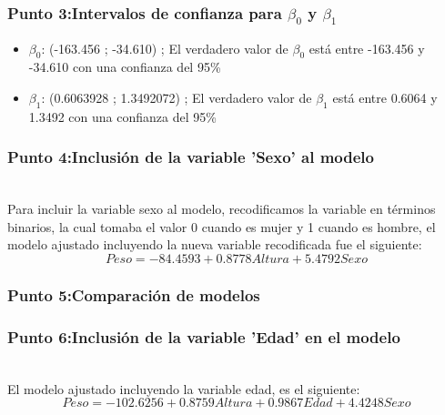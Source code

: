 \documentclass[12pt]{beamer}
\begin{document}
\begin{frame}
\frametitle{Punto 3:Intervalos de confianza para $\beta_{0}$ y $\beta_{1}$}
\begin{itemize}
\item $\beta_{0}$: (-163.456 ; -34.610)  ; El verdadero valor de $\beta_{0}$ está entre -163.456 y -34.610 con una confianza del 95\%
\item $\beta_{1}$: (0.6063928 ; 1.3492072) ; El verdadero valor de $\beta_{1}$ está entre 0.6064 y 1.3492 con una confianza del 95\%
\end{itemize}

\end{frame}
\begin{frame}
\frametitle{Punto 4:Inclusión de la variable 'Sexo' al modelo}
~\\ Para incluir la variable sexo al modelo, recodificamos la variable en términos binarios, la cual tomaba el valor 0 cuando es mujer y 1 cuando es hombre, el modelo ajustado incluyendo la nueva variable recodificada fue el siguiente:
~\\ $$Peso=-84.4593+0.8778 Altura +  5.4792 Sexo $$
\end{frame}
\begin{frame}
\frametitle{Punto 5:Comparación de modelos}

\end{frame}

\begin{frame}
\frametitle{Punto 6:Inclusión de la variable 'Edad' en el modelo}
~\\ El modelo ajustado incluyendo la variable edad, es el siguiente:
~\\ $$Peso=-102.6256+0.8759 Altura +0.9867 Edad +4.4248 Sexo $$
\end{frame}
\end{document}

